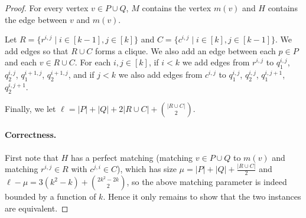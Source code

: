 \begin{proof}
For every vertex $v\in P\cup Q$, $M$ contains the vertex $m(v)$ and $H$ contains the edge between $v$ and $m(v)$.

Let $R = \{ r^{i,j} \mid i \in [k-1], j\in [k] \}$ and $C = \{ c^{i,j} \mid i \in [k], j\in [k-1] \}$. 
We add edges so that $R\cup C$ forms a clique.
We also add an edge between each $p \in P$ and each $v \in R\cup C$. 
For each $i, j \in [k]$, if $i< k$ we add edges from $r^{i,j}$ to $q_1^{i,j}$, $q_2^{i,j}$, $q_1^{i+1,j}$, $q_2^{i+1,j}$, and if $j<k$ we also add edges from $c^{i,j}$ to $q_1^{i,j}$, $q_2^{i,j}$, $q_1^{i,j+1}$, $q_2^{i,j+1}$.

Finally, we let $\ell = |P|+ |Q| + 2|R\cup C| + \binom{|R\cup C|}{2}$.

\paragraph{Correctness.} First note that $H$ has a perfect matching (matching $v\in P\cup Q$ to $m(v)$ and matching $r^{i,j}\in R$ with $c^{j,i}\in C$), which has size $\mu = |P| + |Q| + \frac{|R\cup C|}{2}$ and $\ell - \mu = 3(k^2-k) + \binom{2k^2-2k}{2}$, so the above matching parameter is indeed bounded by a function of $k$. Hence it only remains to show that the two instances are equivalent. 


\end{proof}
